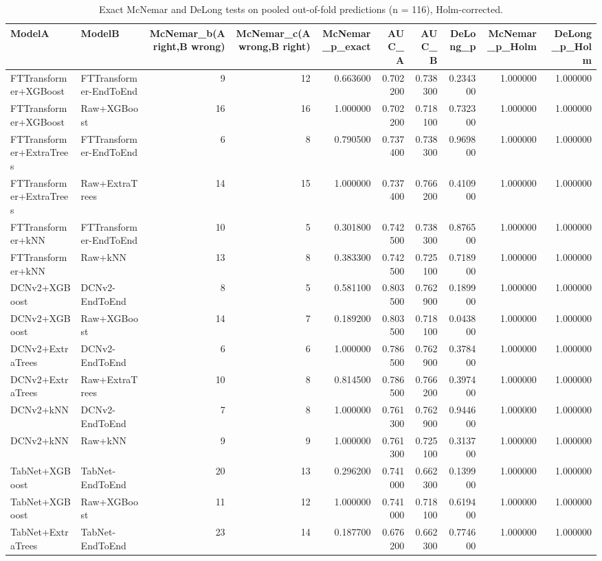 \begin{table}
\caption{Exact McNemar and DeLong tests on pooled out-of-fold predictions (n = 116), Holm-corrected.}
\label{tab:stats}
\begin{tabular}{llrrrrrrrr}
\toprule
ModelA & ModelB & McNemar\_b(A right,B wrong) & McNemar\_c(A wrong,B right) & McNemar\_p\_exact & AUC\_A & AUC\_B & DeLong\_p & McNemar\_p\_Holm & DeLong\_p\_Holm \\
\midrule
FTTransformer+XGBoost & FTTransformer-EndToEnd & 9 & 12 & 0.663600 & 0.702200 & 0.738300 & 0.234300 & 1.000000 & 1.000000 \\
FTTransformer+XGBoost & Raw+XGBoost & 16 & 16 & 1.000000 & 0.702200 & 0.718100 & 0.732300 & 1.000000 & 1.000000 \\
FTTransformer+ExtraTrees & FTTransformer-EndToEnd & 6 & 8 & 0.790500 & 0.737400 & 0.738300 & 0.969800 & 1.000000 & 1.000000 \\
FTTransformer+ExtraTrees & Raw+ExtraTrees & 14 & 15 & 1.000000 & 0.737400 & 0.766200 & 0.410900 & 1.000000 & 1.000000 \\
FTTransformer+kNN & FTTransformer-EndToEnd & 10 & 5 & 0.301800 & 0.742500 & 0.738300 & 0.876500 & 1.000000 & 1.000000 \\
FTTransformer+kNN & Raw+kNN & 13 & 8 & 0.383300 & 0.742500 & 0.725100 & 0.718900 & 1.000000 & 1.000000 \\
DCNv2+XGBoost & DCNv2-EndToEnd & 8 & 5 & 0.581100 & 0.803500 & 0.762900 & 0.189900 & 1.000000 & 1.000000 \\
DCNv2+XGBoost & Raw+XGBoost & 14 & 7 & 0.189200 & 0.803500 & 0.718100 & 0.043800 & 1.000000 & 1.000000 \\
DCNv2+ExtraTrees & DCNv2-EndToEnd & 6 & 6 & 1.000000 & 0.786500 & 0.762900 & 0.378400 & 1.000000 & 1.000000 \\
DCNv2+ExtraTrees & Raw+ExtraTrees & 10 & 8 & 0.814500 & 0.786500 & 0.766200 & 0.397400 & 1.000000 & 1.000000 \\
DCNv2+kNN & DCNv2-EndToEnd & 7 & 8 & 1.000000 & 0.761300 & 0.762900 & 0.944600 & 1.000000 & 1.000000 \\
DCNv2+kNN & Raw+kNN & 9 & 9 & 1.000000 & 0.761300 & 0.725100 & 0.313700 & 1.000000 & 1.000000 \\
TabNet+XGBoost & TabNet-EndToEnd & 20 & 13 & 0.296200 & 0.741000 & 0.662300 & 0.139900 & 1.000000 & 1.000000 \\
TabNet+XGBoost & Raw+XGBoost & 11 & 12 & 1.000000 & 0.741000 & 0.718100 & 0.619400 & 1.000000 & 1.000000 \\
TabNet+ExtraTrees & TabNet-EndToEnd & 23 & 14 & 0.187700 & 0.676200 & 0.662300 & 0.774600 & 1.000000 & 1.000000 \\

\end{tabular}
\end{table}
